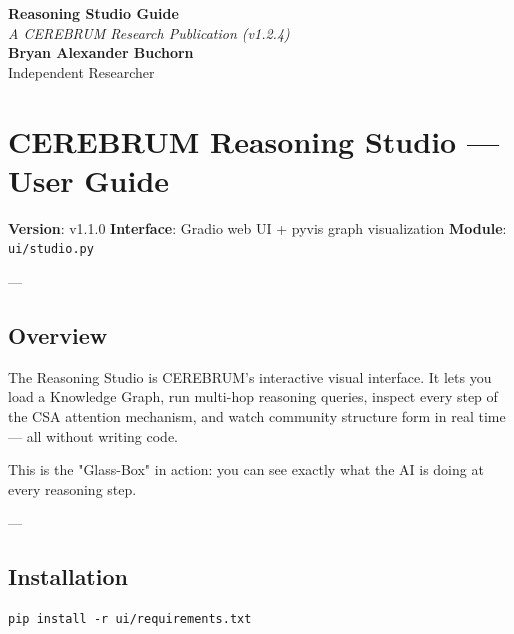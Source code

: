 \documentclass[11pt,article,oneside]{memoir}
\begin{document}
\begin{center}
    \Huge \textbf{Reasoning Studio Guide} \\
    \vspace{0.5em}
    \large \textit{A CEREBRUM Research Publication (v1.2.4)} \\
    \vspace{1em}
    \large \textbf{Bryan Alexander Buchorn} \\
    Independent Researcher \\
    \vspace{2em}
\end{center}

\begin{abstract}
\textbf{Overview:} This guide provides a conceptual entry point into the CEREBRUM framework. It is designed for practitioners and researchers seeking to understand the core reasoning signals of Framework Implementation Guide.
\end{abstract}

\section{CEREBRUM Reasoning Studio — User Guide}

\textbf{Version}: v1.1.0
\textbf{Interface}: Gradio web UI + pyvis graph visua\-lization
\textbf{Module}: \texttt{ui/studio.py}

---

\subsection{Overview}

The Reasoning Studio is CEREBRUM's interactive visual interface. It lets you load a Knowledge Graph, run multi-hop reasoning queries, inspect every step of the CSA attention mechanism, and watch community structure form in real time — all without writing code.

This is the "Glass-Box" in action: you can see exactly what the AI is doing at every reasoning step.

---

\subsection{Instal\-lation}

\begin{lstlisting}
pip install -r ui/requirements.txt
\end{lstlisting}
\end{document}

